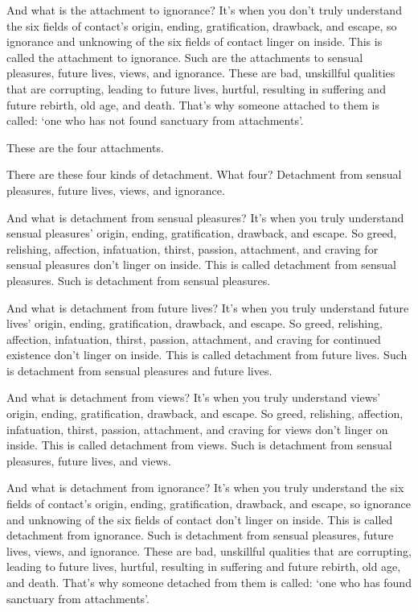 \documentclass[12pt,openany]{book}%
\begin{document}
And what is the attachment to ignorance? It’s when you don’t truly understand the six fields of contact’s origin, ending, gratification, drawback, and escape, so ignorance and unknowing of the six fields of contact linger on inside. This is called the attachment to ignorance. Such are the attachments to sensual pleasures, future lives, views, and ignorance. These are bad, unskillful qualities that are corrupting, leading to future lives, hurtful, resulting in suffering and future rebirth, old age, and death. That’s why someone attached to them is called: ‘one who has not found sanctuary from attachments’. 

These are the four attachments. 

There are these four kinds of detachment. What four? Detachment from sensual pleasures, future lives, views, and ignorance. 

And what is detachment from sensual pleasures? It’s when you truly understand sensual pleasures’ origin, ending, gratification, drawback, and escape. So greed, relishing, affection, infatuation, thirst, passion, attachment, and craving for sensual pleasures don’t linger on inside. This is called detachment from sensual pleasures. Such is detachment from sensual pleasures. 

And what is detachment from future lives? It’s when you truly understand future lives’ origin, ending, gratification, drawback, and escape. So greed, relishing, affection, infatuation, thirst, passion, attachment, and craving for continued existence don’t linger on inside. This is called detachment from future lives. Such is detachment from sensual pleasures and future lives. 

And what is detachment from views? It’s when you truly understand views’ origin, ending, gratification, drawback, and escape. So greed, relishing, affection, infatuation, thirst, passion, attachment, and craving for views don’t linger on inside. This is called detachment from views. Such is detachment from sensual pleasures, future lives, and views. 

And what is detachment from ignorance? It’s when you truly understand the six fields of contact’s origin, ending, gratification, drawback, and escape, so ignorance and unknowing of the six fields of contact don’t linger on inside. This is called detachment from ignorance. Such is detachment from sensual pleasures, future lives, views, and ignorance. These are bad, unskillful qualities that are corrupting, leading to future lives, hurtful, resulting in suffering and future rebirth, old age, and death. That’s why someone detached from them is called: ‘one who has found sanctuary from attachments’. 
\end{document}
